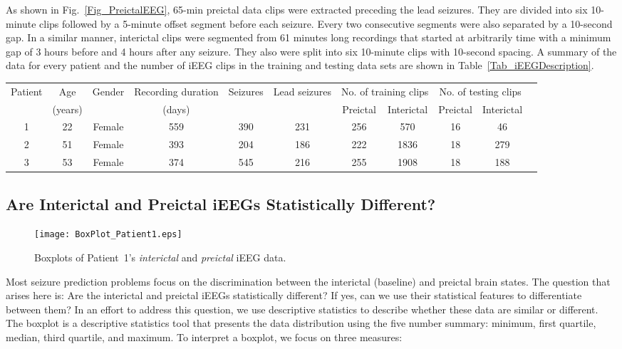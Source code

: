 \documentclass[journal]{IEEEtran}
\begin{document}
As shown in Fig.~\ref{Fig_PreictalEEG}, 65-min preictal data clips were extracted preceding the lead seizures. They are divided into six 10-minute clips followed by a 5-minute offset segment before each seizure. Every two consecutive segments were also separated by a 10-second gap. In a similar manner, interictal clips were segmented from 61 minutes long recordings that started at arbitrarily time with a minimum gap of 3 hours before and 4 hours after any seizure. They also were split into six 10-minute clips with 10-second spacing. A summary of the data for every patient and the number of iEEG clips in the training and testing data sets are shown in Table~\ref{Tab_iEEGDescription}.




\begin{table*}[!t]\centering
	\caption{Description of the seizure prediction intracranial EEG dataset \cite{cook2013prediction}.}
\label{Tab_iEEGDescription}
	\begin{tabular}{c c c c c c c c c c c}
		\hline
		\hline
		Patient & Age & Gender & Recording duration & Seizures & Lead seizures & \multicolumn{2}{c}{No. of training clips} & \multicolumn{2}{c}{No. of testing clips}  \\
		& (years) & & (days) & &  & Preictal & Interictal &  Preictal & Interictal  \\
		\hline
		1 & 22 & Female & 559 & 390 & 231 & 256 & 570 & 16 & 46 \\
		2 & 51 & Female & 393 & 204 & 186 & 222 & 1836 & 18 & 279 \\
		3 & 53 & Female & 374 & 545 & 216 & 255 & 1908 & 18 & 188 \\
		\hline
		\hline
	\end{tabular}
\end{table*}

\subsection{Are Interictal and Preictal iEEGs Statistically Different?}

\begin{figure}[!t]\centering
	\texttt{[image: BoxPlot\_Patient1.eps]}
	\caption{Boxplots of Patient~1’s \textit{interictal} and \textit{preictal} iEEG data.}
\label{Fig_BoxPlot_Patient1}
\end{figure}

Most seizure prediction problems focus on the discrimination between the interictal (baseline) and preictal brain states. The question that arises here is: Are the interictal and preictal iEEGs statistically different? If yes, can we use their statistical features to differentiate between them? In an effort to address this question, we use descriptive statistics to describe whether these data are similar or different. The boxplot is a descriptive statistics tool that presents the data distribution using the five number summary: minimum, first quartile, median, third quartile, and maximum. To interpret a boxplot, we focus on three measures:
\end{document}
